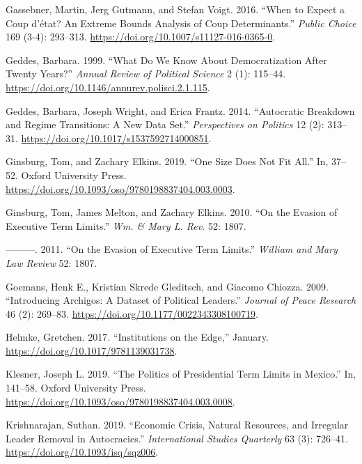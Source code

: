 \documentclass[
  12pt,
]{report}
\newlength{\cslhangindent}
\newenvironment{CSLReferences}[2] %
 {\begin{list}{}{%
  \setlength{\itemindent}{0pt}
  \setlength{\leftmargin}{0pt}
  \setlength{\parsep}{0pt}
  \ifodd #1
   \setlength{\leftmargin}{\cslhangindent}
   \setlength{\itemindent}{-1\cslhangindent}
  \fi
  \setlength{\itemsep}{#2\baselineskip}}}
 {\end{list}}
\begin{document}
\begin{CSLReferences}{1}{0}
Gassebner, Martin, Jerg Gutmann, and Stefan Voigt. 2016. {``When to
Expect a Coup d{'}état? An Extreme Bounds Analysis of Coup
Determinants.''} \emph{Public Choice} 169 (3-4): 293--313.
\url{https://doi.org/10.1007/s11127-016-0365-0}.

Geddes, Barbara. 1999. {``What Do We Know About Democratization After
Twenty Years?''} \emph{Annual Review of Political Science} 2 (1):
115--44. \url{https://doi.org/10.1146/annurev.polisci.2.1.115}.

Geddes, Barbara, Joseph Wright, and Erica Frantz. 2014. {``Autocratic
Breakdown and Regime Transitions: A New Data Set.''} \emph{Perspectives
on Politics} 12 (2): 313--31.
\url{https://doi.org/10.1017/s1537592714000851}.

Ginsburg, Tom, and Zachary Elkins. 2019. {``One Size Does Not Fit
All.''} In, 37--52. Oxford University Press.
\url{https://doi.org/10.1093/oso/9780198837404.003.0003}.

Ginsburg, Tom, James Melton, and Zachary Elkins. 2010. {``On the Evasion
of Executive Term Limits.''} \emph{Wm. \& Mary L. Rev.} 52: 1807.

---------. 2011. {``On the Evasion of Executive Term Limits.''}
\emph{William and Mary Law Review} 52: 1807.

Goemans, Henk E., Kristian Skrede Gleditsch, and Giacomo Chiozza. 2009.
{``Introducing Archigos: A Dataset of Political Leaders.''}
\emph{Journal of Peace Research} 46 (2): 269--83.
\url{https://doi.org/10.1177/0022343308100719}.

Helmke, Gretchen. 2017. {``Institutions on the Edge,''} January.
\url{https://doi.org/10.1017/9781139031738}.

Klesner, Joseph L. 2019. {``The Politics of Presidential Term Limits in
Mexico.''} In, 141--58. Oxford University Press.
\url{https://doi.org/10.1093/oso/9780198837404.003.0008}.

Krishnarajan, Suthan. 2019. {``Economic Crisis, Natural Resources, and
Irregular Leader Removal in Autocracies.''} \emph{International Studies
Quarterly} 63 (3): 726--41. \url{https://doi.org/10.1093/isq/sqz006}.


\end{CSLReferences}
\end{document}
